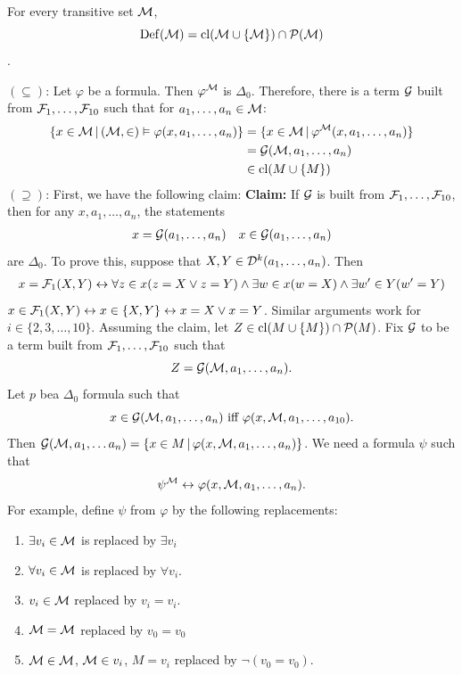 \documentclass{article}
\begin{document}
\begin{fancythm}{}
    For every transitive set $\mathcal{M}$, \[\operatorname{Def}(\mathcal{M}) = \operatorname{cl}(\mathcal{M} \cup \{ \mathcal{M} \}) \cap \mathcal{P}(\mathcal{M})\].
\end{fancythm}
\newlec
\proof $(\subseteq)$: Let $\varphi$ be a formula. Then $\varphi^{\mathcal{M}}$ is $\Delta_{0}$. Therefore, there is a term $\mathcal{G}$ built from $\mathcal{F}_{1}, \dots, \mathcal{F}_{10}$ such that for $a_{1},\dots, a_{n} \in \mathcal{M}$:
\begin{align*}
    \{x \in \mathcal{M} \, | \, (\mathcal{M}, \in) \vDash \varphi(x,a_{1},\dots, a_{n})\} & = \{ x \in \mathcal{M} \, | \, \varphi^{\mathcal{M}}(x,a_{1},\dots,a_{n})\} \\
                                                                               & = \mathcal{G}(\mathcal{M},a_{1},\dots, a_{n})                               \\
                                                                               & \in \operatorname{cl}(M \cup \{M\})                                           \\
\end{align*}
$(\supseteq)$: First, we have the following claim: \gap \textbf{Claim:} If $\mathcal{G}$ is built from $\mathcal{F}_{1},\dots, \mathcal{F}_{10}$, then for any $x,a_{1},\dots,a_{n}$, the statements \begin{align*}
    x = \mathcal{G}(a_{1},\dots,a_{n}) &  & x \in \mathcal{G}(a_{1},\dots,a_{n})
\end{align*}
are $\Delta_{0}$. To prove this, suppose that $X,Y \in \mathcal{D}^{k}(a_{1},\dots,a_{n})$. Then
\begin{align*}
    x=\mathcal{F}_{1}(X,Y) \leftrightarrow \forall z \in x (z=X \vee z=Y) \wedge \exists w \in x ( w = X) \wedge \exists w' \in Y (w'=Y)
\end{align*}
$x \in \mathcal{F}_{1}(X,Y) \leftrightarrow x \in \{X,Y\} \leftrightarrow x=X \vee x=Y$. Similar arguments work for $i \in \{2,3,\dots,10\}$.\gap
Assuming the claim, let $Z \in \operatorname{cl}(M \cup \{M\}) \cap \mathcal{P}(M)$. Fix $\mathcal{G}$ to be a term built from $\mathcal{F}_{1},\dots,\mathcal{F}_{10}$ such that \[ Z = \mathcal{G}(\mathcal{M}, a_{1},\dots, a_{n}).\]
Let $p$ bea $\Delta_{0}$ formula such that \[ x \in \mathcal{G}(\mathcal{M}, a_{1},\dots, a_{n}) \text{ iff } \varphi(x,\mathcal{M}, a_{1}, \dots, a_{10}).\]
Then $\mathcal{G}(\mathcal{M}, a_{1}, \dots a_{n}) = \{ x \in M \, | \, \varphi(x,\mathcal{M},a_{1},\dots,a_{n})\}$. We need a formula $\psi$ such that \[ \psi^{\mathcal{M}} \leftrightarrow \varphi(x,\mathcal{M}, a_{1},\dots, a_{n}).\]
For example, define $\psi$ from $\varphi$ by the following replacements: \begin{enumerate}
    \item[(i)] $\exists v_{i} \in \mathcal{M}$ is replaced by $\exists v_{i}$
    \item[(ii)] $\forall v_{i} \in \mathcal{M}$ is replaced by $\forall v_{i}$.
    \item[(iii)] $v_{i} \in \mathcal{M}$ replaced by $v_{i}=v_{i}$.
    \item[(iv)] $\mathcal{M} = \mathcal{M}$ replaced by $v_{0}=v_{0}$
    \item[(v)] $\mathcal{M} \in \mathcal{M}$, $\mathcal{M} \in v_{i}$, $M =v_{i}$ replaced by $\neg (v_{0} = v_{0})$.
\end{enumerate}
\end{document}
